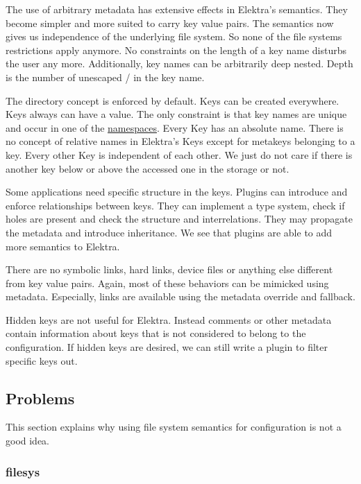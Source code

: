 The use of arbitrary metadata has extensive effects in Elektra’s semantics. They become simpler and more suited to carry key value pairs. The semantics now gives us independence of the underlying file system. So none of the file system\textquotesingle{}s restrictions apply anymore. No constraints on the length of a key name disturbs the user any more. Additionally, key names can be arbitrarily deep nested. Depth is the number of unescaped {\ttfamily /} in the key name.

The directory concept is enforced by default. Keys can be created everywhere. Keys always can have a value. The only constraint is that key names are unique and occur in one of the \hyperlink{doc_help_elektra-namespaces_md}{namespaces}. Every Key has an absolute name. There is no concept of relative names in Elektra’s Keys except for metakeys belonging to a key. Every other Key is independent of each other. We just do not care if there is another key below or above the accessed one in the storage or not.

Some applications need specific structure in the keys. Plugins can introduce and enforce relationships between keys. They can implement a type system, check if holes are present and check the structure and interrelations. They may propagate the metadata and introduce inheritance. We see that plugins are able to add more semantics to Elektra.

There are no symbolic links, hard links, device files or anything else different from key value pairs. Again, most of these behaviors can be mimicked using metadata. Especially, links are available using the metadata {\ttfamily override} and {\ttfamily fallback}.

Hidden keys are not useful for Elektra. Instead comments or other metadata contain information about keys that is not considered to belong to the configuration. If hidden keys are desired, we can still write a plugin to filter specific keys out.

\subsection*{Problems}

This section explains why using file system semantics for configuration is not a good idea.

\subsubsection*{filesys}

